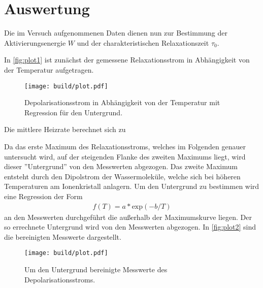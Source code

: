 \section{Auswertung}
\label{sec:Auswertung}

Die im Versuch aufgenommenen Daten dienen nun zur Bestimmung der Aktivierungsenergie $W$ und der charakteristischen Relaxationszeit $\tau_0$.

In \autoref{fig:plot1} ist zunächst der gemessene Relaxationsstrom in Abhängigkeit von der Temperatur aufgetragen.

\begin{figure}[H]
  \centering
  \texttt{[image: build/plot.pdf]}
  \caption{Depolarisationsstrom in Abhängigkeit von der Temperatur mit Regression für den Untergrund.}
  \label{fig:plot1}
\end{figure}

Die mittlere Heizrate berechnet sich zu

Da das erste Maximum des Relaxationsstroms, welches im Folgenden genauer
untersucht wird, auf der steigenden Flanke des zweiten Maximums liegt, wird dieser
”Untergrund” von den Messwerten abgezogen.
Das zweite Maximum entsteht durch den Dipolstrom der Wassermoleküle, welche sich bei höheren Temperaturen am Ionenkristall anlagern.
Um den Untergrund zu bestimmen wird eine Regression der Form
\begin{align*}
  f(T)= a * \text{exp}(-b/T)
\end{align*}
an den Messwerten durchgeführt die außerhalb der Maximumskurve liegen.
Der so errechnete Untergrund wird von den Messwerten abgezogen.
In \autoref{fig:plot2} sind die bereinigten Messwerte dargestellt.

\begin{figure}[H]
  \centering
  \texttt{[image: build/plot.pdf]}
  \caption{Um den Untergrund bereinigte Messwerte des Depolarisationsstroms.}
  \label{fig:plot2}
\end{figure}


